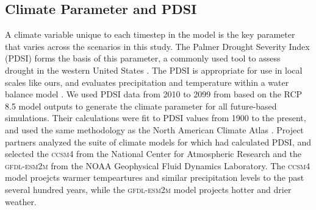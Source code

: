 

\subsection{Climate Parameter and PDSI}
A climate variable unique to each timestep in the model is the key parameter that varies across the scenarios in this study. The Palmer Drought Severity Index (PDSI) forms the basis of this parameter, a commonly used tool to assess drought in the western United States \citep{Cook2004}. The PDSI is appropriate for use in local scales like ours, and evaluates precipitation and temperature within a water balance model \citep{HeimJr2002}. We used PDSI data from 2010 to 2099 from \citet{Cook2014} based on the RCP 8.5 model outputs to generate the climate parameter for all future-based simulations. Their calculations were fit to PDSI values from 1900 to the present, and used the same methodology as the North American Climate Atlas \citep{Cook2004}. Project partners analyzed the suite of climate models for which \citet{Cook2014} had calculated PDSI, and selected the \textsc{ccsm4} from the National Center for Atmospheric Research and the \textsc{gfdl-esm2m} from the NOAA Geophysical Fluid Dynamics Laboratory. The \textsc{ccsm4} model proejcts warmer tempeartures and similar precipitation levels to the past several hundred years, while the \textsc{gfdl-esm2m} model projects hotter and drier weather.

